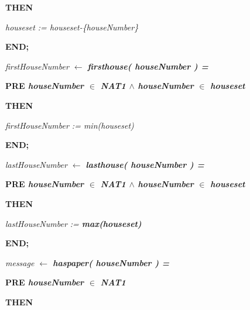 \documentclass[11pt]{article}
\begin{document}
\begin{sloppypar}
\hspace*{0.60in}\bf THEN

\hspace*{0.80in}\it houseset \rm := \it houseset\rm -\rm \{\it houseNumber\rm \}

\hspace*{0.60in}\bf END\rm ;

\hspace*{0.20in}

\hspace*{0.40in}\it firstHouseNumber  $\leftarrow$  \bf firsthouse\rm ( \it houseNumber \rm ) \rm =

\hspace*{0.60in}\bf PRE \it houseNumber  $\in$  \bf NAT1  $\land$  \it houseNumber  $\in$  \it houseset

\hspace*{0.60in}\bf THEN

\hspace*{0.80in}\it firstHouseNumber \rm := \rm min\rm (\it houseset\rm )

\hspace*{0.60in}\bf END\rm ;

\hspace*{0.20in}

\hspace*{0.40in}\it lastHouseNumber  $\leftarrow$  \bf lasthouse\rm ( \it houseNumber \rm ) \rm =

\hspace*{0.60in}\bf PRE \it houseNumber  $\in$  \bf NAT1  $\land$  \it houseNumber  $\in$  \it houseset

\hspace*{0.60in}\bf THEN

\hspace*{0.80in}\it lastHouseNumber \rm := \bf max\rm (\it houseset\rm )

\hspace*{0.60in}\bf END\rm ;

\hspace*{0.20in}

\hspace*{0.40in}\hspace*{0.40in}\it message  $\leftarrow$  \bf haspaper\rm ( \it houseNumber \rm ) \rm =

\hspace*{0.60in}\bf PRE \it houseNumber  $\in$  \bf NAT1\hspace*{0.10in}

\hspace*{0.60in}\bf THEN


\end{sloppypar}
\end{document}
